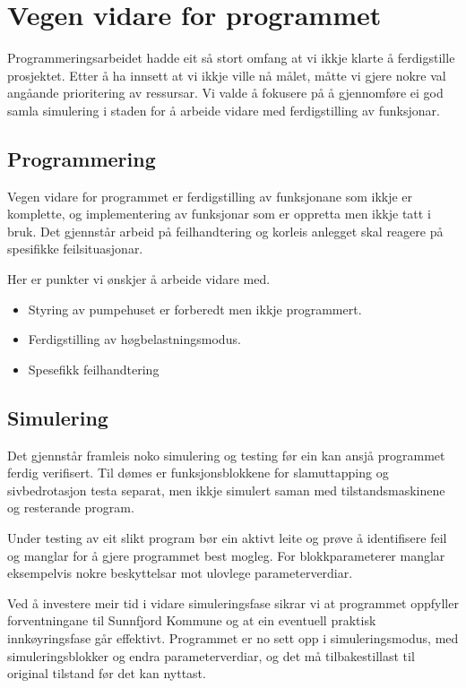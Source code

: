 \section{Vegen vidare for programmet}
\thispagestyle{fancy}

Programmeringsarbeidet hadde eit så stort omfang at vi ikkje klarte å ferdigstille prosjektet.
Etter å ha innsett at vi ikkje ville nå målet, måtte vi gjere nokre val angåande prioritering av ressursar. 
Vi valde å fokusere på å gjennomføre ei god samla simulering i staden for å arbeide vidare med ferdigstilling av funksjonar.

\subsection{Programmering}

Vegen vidare for programmet er ferdigstilling av funksjonane som ikkje er komplette, og 
implementering av funksjonar som er oppretta men ikkje tatt i bruk. 
Det gjennstår arbeid på feilhandtering og korleis anlegget skal reagere på spesifikke feilsituasjonar.

Her er punkter vi ønskjer å arbeide vidare med.

\begin{itemize}
    \item Styring av pumpehuset er forberedt men ikkje programmert. 
    \item Ferdigstilling av høgbelastningsmodus.
    \item Spesefikk feilhandtering
\end{itemize}

\subsection{Simulering}

Det gjennstår framleis noko simulering og testing før ein kan ansjå programmet ferdig verifisert.
Til dømes er funksjonsblokkene for slamuttapping og sivbedrotasjon testa separat, men ikkje simulert saman med
tilstandsmaskinene og resterande program.

Under testing av eit slikt program bør ein aktivt leite og prøve å identifisere feil og manglar for å gjere programmet best mogleg.
For blokkparameterer manglar eksempelvis nokre beskyttelsar mot ulovlege parameterverdiar.

Ved å investere meir tid i vidare simuleringsfase sikrar vi at programmet oppfyller forventningane til \gls{Sunnfjord Kommune} og at ein eventuell
praktisk innkøyringsfase går effektivt. \newline
Programmet er no sett opp i simuleringsmodus, med simuleringsblokker og endra parameterverdiar, 
og det må tilbakestillast til original tilstand før det kan nyttast. 




\newpage